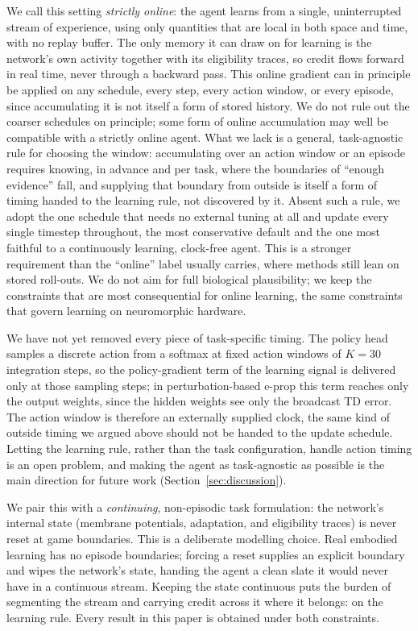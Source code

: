 \documentclass[10pt,twocolumn]{article}
\newcommand{\method}{perturbation-based e-prop}   %
\begin{document}
We call this setting \emph{strictly online}: the agent learns from a single,
uninterrupted stream of experience, using only quantities that are local in
both space and time, with no replay buffer. The only memory it can draw on for
learning is the network's own activity together with its eligibility traces,
so credit flows forward in real time, never through a backward pass. This
online gradient can in principle be applied on any schedule, every step, every
action window, or every episode, since accumulating it is not itself a form of
stored history. We do not rule out the coarser schedules on principle; some
form of online accumulation may well be compatible with a strictly online
agent. What we lack is a general, task-agnostic rule for choosing the window:
accumulating over an action window or an episode requires knowing, in advance
and per task, where the boundaries of ``enough evidence'' fall, and supplying
that boundary from outside is itself a form of timing handed to the learning
rule, not discovered by it. Absent such a rule, we adopt the one
schedule that needs no external tuning at all and update every single
timestep throughout, the most conservative default and the one most faithful
to a continuously learning, clock-free agent. This is a stronger requirement
than the ``online'' label usually carries, where methods still lean on stored
roll-outs. We do not aim for full biological plausibility; we keep the
constraints that are most consequential for online learning, the same
constraints that govern learning on neuromorphic hardware.

We have not yet removed every piece of task-specific timing. The policy head
samples a discrete action from a softmax at fixed action windows of $K=30$
integration steps, so the policy-gradient term of the learning signal is
delivered only at those sampling steps; in \method{} this term
reaches only the output weights, since the hidden weights see only the
broadcast TD error. The action window is therefore an externally supplied
clock, the same kind of outside timing we argued above should not be handed
to the update schedule. Letting the learning rule, rather than the task
configuration, handle action timing is an open problem, and making the agent
as task-agnostic as possible is the main direction for future work
(Section~\ref{sec:discussion}).

We pair this with a \emph{continuing}, non-episodic task formulation: the
network's internal state (membrane potentials, adaptation, and eligibility
traces) is never reset at game boundaries. This is a deliberate modelling
choice. Real embodied learning has no episode boundaries; forcing a reset
supplies an explicit boundary and wipes the network's state, handing the agent
a clean slate it would never have in a continuous stream. Keeping the state
continuous puts the burden of segmenting the stream and carrying credit across
it where it belongs: on the learning rule. Every result in this paper is
obtained under both constraints.
\end{document}
